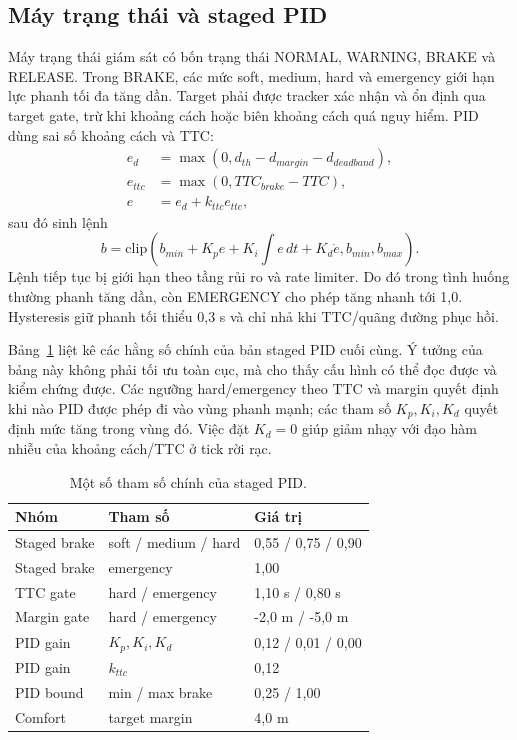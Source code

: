 \documentclass[conference]{IEEEtran}
\begin{document}
\subsection{Máy trạng thái và staged PID}
Máy trạng thái giám sát có bốn trạng thái NORMAL, WARNING, BRAKE và RELEASE. Trong BRAKE, các mức soft, medium, hard và emergency giới hạn lực phanh tối đa tăng dần. Target phải được tracker xác nhận và ổn định qua target gate, trừ khi khoảng cách hoặc biên khoảng cách quá nguy hiểm. PID dùng sai số khoảng cách và TTC:
\begin{equation}
\begin{aligned}
e_d&=\max(0,d_{th}-d_{margin}-d_{deadband}),\\
e_{ttc}&=\max(0,TTC_{brake}-TTC),\\
e&=e_d+k_{ttc}e_{ttc},
\end{aligned}
\label{eq:error}
\end{equation}
sau đó sinh lệnh
\begin{equation}
b=\mathrm{clip}(b_{min}+K_pe+K_i\!\int e\,dt+K_d\dot e,b_{min},b_{max}).
\label{eq:pid}
\end{equation}
Lệnh tiếp tục bị giới hạn theo tầng rủi ro và rate limiter. Do đó trong tình huống thường phanh tăng dần, còn EMERGENCY cho phép tăng nhanh tới 1,0. Hysteresis giữ phanh tối thiểu 0,3 s và chỉ nhả khi TTC/quãng đường phục hồi.

Bảng~\ref{tab:pidparam} liệt kê các hằng số chính của bản staged PID cuối cùng. Ý tưởng của bảng này không phải tối ưu toàn cục, mà cho thấy cấu hình có thể đọc được và kiểm chứng được. Các ngưỡng hard/emergency theo TTC và margin quyết định khi nào PID được phép đi vào vùng phanh mạnh; các tham số $K_p,K_i,K_d$ quyết định mức tăng trong vùng đó. Việc đặt $K_d=0$ giúp giảm nhạy với đạo hàm nhiễu của khoảng cách/TTC ở tick rời rạc.

\begin{table}[t]
\caption{Một số tham số chính của staged PID.}
\label{tab:pidparam}
\centering
\footnotesize
\begin{tabular}{lll}
\toprule
Nhóm & Tham số & Giá trị \\
\midrule
Staged brake & soft / medium / hard & 0,55 / 0,75 / 0,90 \\
Staged brake & emergency & 1,00 \\
TTC gate & hard / emergency & 1,10 s / 0,80 s \\
Margin gate & hard / emergency & -2,0 m / -5,0 m \\
PID gain & $K_p,K_i,K_d$ & 0,12 / 0,01 / 0,00 \\
PID gain & $k_{ttc}$ & 0,12 \\
PID bound & min / max brake & 0,25 / 1,00 \\
Comfort & target margin & 4,0 m \\
\bottomrule
\end{tabular}
\end{table}
\end{document}

